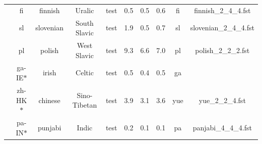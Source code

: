 \begin{table}[h!]
\begin{center}
\begin{tabular}{@{}cccccccccc@{}}
                                  & fi                             & finnish                        & Uralic      &test                     & 0.5        & 0.5        & 0.6      & fi        & finnish\_2\_4\_4.fst        \\
                                  & sl                             & slovenian                      & South Slavic     &test                & 1.9        & 0.5        & 0.7      & sl        & slovenian\_2\_4\_4.fst      \\
                                  & pl                             & polish                         & West Slavic     &test                 & 9.3        & 6.6        & 7.0      & pl        & polish\_2\_2\_2.fst         \\
                                  & ga-IE$*$                         & irish                          & Celtic        &test                   & 0.5        & 0.4        & 0.5      & ga        &                             \\
                                  & zh-HK$*$                         & chinese                        & Sino-Tibetan   &test                  & 3.9        & 3.1        & 3.6      & yue       & yue\_2\_2\_4.fst            \\
                                  & pa-IN$*$                          & punjabi                        & Indic     &test                       & 0.2        & 0.1        & 0.1      & pa        & panjabi\_4\_4\_4.fst        \\
                                \bottomrule
\end{tabular}
\end{center}
\end{table}